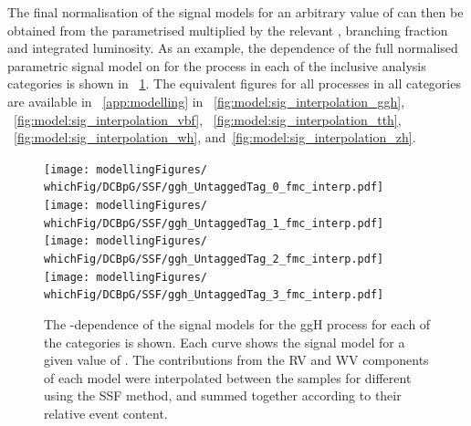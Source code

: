 The final normalisation of the signal models for an arbitrary value of \mH can then be obtained from the parametrised \effxacc multiplied by the relevant \crosssection, branching fraction and integrated luminosity.
As an example, the dependence of the full normalised parametric signal model on \mH for the \ggH process in each of the inclusive analysis categories is shown in \Fig\s~\ref{fig:model:sig_interpolation}. The equivalent figures for all processes in all categories are available in \App~\ref{app:modelling} in \Fig\s~\ref{fig:model:sig_interpolation_ggh}, ~\ref{fig:model:sig_interpolation_vbf}, ~\ref{fig:model:sig_interpolation_tth}, ~\ref{fig:model:sig_interpolation_wh}, and~\ref{fig:model:sig_interpolation_zh}.

\begin{figure}[htp!]
\centering
\texttt{[image: modellingFigures/\\whichFig/DCBpG/SSF/ggh\_UntaggedTag\_0\_fmc\_interp.pdf]} 
\texttt{[image: modellingFigures/\\whichFig/DCBpG/SSF/ggh\_UntaggedTag\_1\_fmc\_interp.pdf]} \\ 
\texttt{[image: modellingFigures/\\whichFig/DCBpG/SSF/ggh\_UntaggedTag\_2\_fmc\_interp.pdf]} 
\texttt{[image: modellingFigures/\\whichFig/DCBpG/SSF/ggh\_UntaggedTag\_3\_fmc\_interp.pdf]} \\
\caption{The \mH-dependence of the signal models for the ggH process for each of the \Untagged categories is shown. Each curve shows the signal model for a given value of \mH. The contributions from the RV and WV components of each model were interpolated between the samples for different \mH using the SSF method, and summed together according to their relative event content.}

\label{fig:model:sig_interpolation}
\end{figure}

